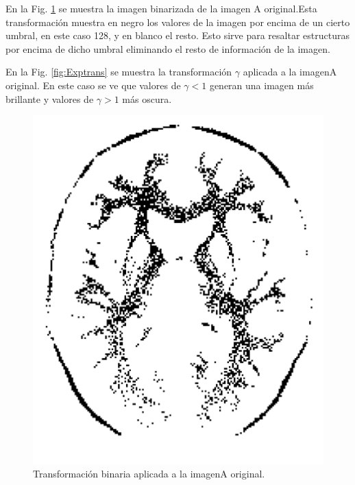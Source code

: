 \documentclass[11pt,twocolumn,twoside]{opticajnl}
\begin{document}
En la Fig. \ref{fig:binarytrans} se muestra la imagen binarizada de la imagen A original.Esta transformación muestra en negro los valores de la imagen por encima de un cierto umbral, en este caso 128, y en blanco el resto. Esto sirve para resaltar estructuras por encima de dicho umbral eliminando el resto de información de la imagen. 

En la Fig. \ref{fig:Exptrans} se muestra la transformación $\gamma$ aplicada a la imagenA original. En este caso se ve que valores de $\gamma < 1$ generan una imagen más brillante y valores de $\gamma > 1 $ más oscura.

\begin{figure}[h]
    \centering
        \includegraphics[width=0.4\linewidth]{Figuras/ImageA_binary.png}
    \caption{Transformación binaria aplicada a la imagenA original.}
    \label{fig:binarytrans}
\end{figure}
\end{document}
